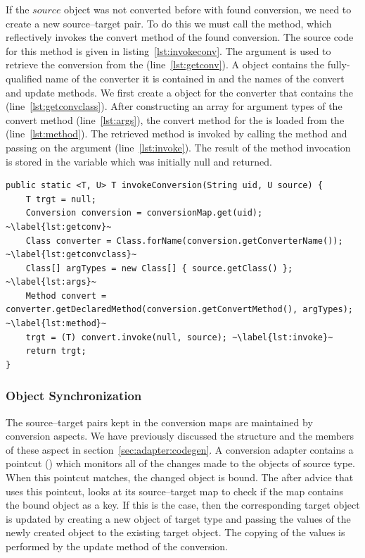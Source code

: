 If the $source$ object was not converted before with found conversion, we need to create a new source--target pair.
To do this we must call the  method, which reflectively invokes the convert method of the found conversion.
The source code for this method is given in listing~\ref{lst:invokeconv}.
The argument  is used to retrieve the conversion from the  (line~\ref{lst:getconv}). A  object contains the fully-qualified name of the converter it is contained in and the names of the convert and update methods. 
We first create a  object for the converter that contains the  (line~\ref{lst:getconvclass}). 
After constructing an array for argument types of the convert method (line~\ref{lst:args}), the convert method for the  is loaded from the  (line~\ref{lst:method}). 
The retrieved method is invoked by calling the  method and passing on the argument  (line~\ref{lst:invoke}).
The result of the method invocation is stored in the variable  which was initially null and returned. 


\begin{lstlisting}[float, caption={The \lstinln{invokeConversion} method which reflectively invokes the convert method of a given conversion}, label={lst:invokeconv}]
public static <T, U> T invokeConversion(String uid, U source) {
	T trgt = null;
	Conversion conversion = conversionMap.get(uid); ~\label{lst:getconv}~
	Class converter = Class.forName(conversion.getConverterName()); ~\label{lst:getconvclass}~
	Class[] argTypes = new Class[] { source.getClass() }; ~\label{lst:args}~
	Method convert = converter.getDeclaredMethod(conversion.getConvertMethod(), argTypes); ~\label{lst:method}~
	trgt = (T) convert.invoke(null, source); ~\label{lst:invoke}~
	return trgt;
}
\end{lstlisting}


\subsubsection{Object Synchronization}
\label{sec:adapter:sync}
The source--target pairs kept in the conversion maps are maintained by conversion aspects. 
We have previously discussed the structure and the members of these aspect in section~\ref{sec:adapter:codegen}.
A conversion adapter contains a pointcut () which monitors all of the changes made to the objects of source type.
When this pointcut matches, the changed object is bound. 
The after advice that uses this pointcut, looks at its source--target map to check if the map contains the bound object as a key. 
If this is the case, then the corresponding target object is updated by creating a new object of target type and passing the values of the newly created object to the existing target object. 
The copying of the values is performed by the update method of the conversion.

